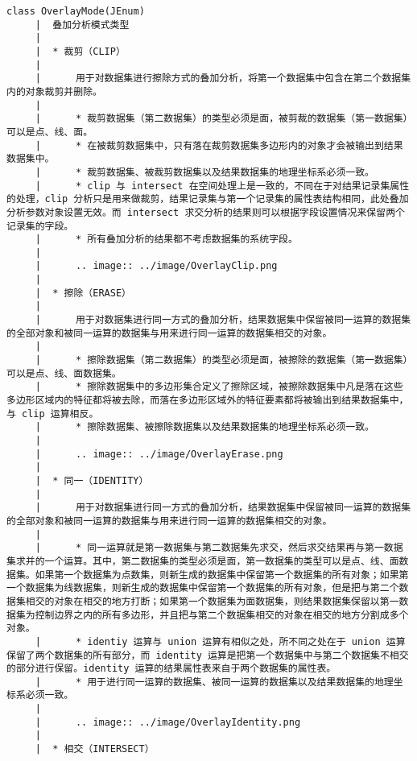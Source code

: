 \documentclass[11pt]{article}
\begin{document}
\begin{Verbatim}[commandchars=\\\{\}]
    class OverlayMode(JEnum)
     |  叠加分析模式类型
     |  
     |  * 裁剪（CLIP）
     |  
     |      用于对数据集进行擦除方式的叠加分析，将第一个数据集中包含在第二个数据集内的对象裁剪并删除。
     |  
     |      * 裁剪数据集（第二数据集）的类型必须是面，被剪裁的数据集（第一数据集）可以是点、线、面。
     |      * 在被裁剪数据集中，只有落在裁剪数据集多边形内的对象才会被输出到结果数据集中。
     |      * 裁剪数据集、被裁剪数据集以及结果数据集的地理坐标系必须一致。
     |      * clip 与 intersect 在空间处理上是一致的，不同在于对结果记录集属性的处理，clip 分析只是用来做裁剪，结果记录集与第一个记录集的属性表结构相同，此处叠加分析参数对象设置无效。而 intersect 求交分析的结果则可以根据字段设置情况来保留两个记录集的字段。
     |      * 所有叠加分析的结果都不考虑数据集的系统字段。
     |  
     |      .. image:: ../image/OverlayClip.png
     |  
     |  * 擦除（ERASE）
     |  
     |      用于对数据集进行同一方式的叠加分析，结果数据集中保留被同一运算的数据集的全部对象和被同一运算的数据集与用来进行同一运算的数据集相交的对象。
     |  
     |      * 擦除数据集（第二数据集）的类型必须是面，被擦除的数据集（第一数据集）可以是点、线、面数据集。
     |      * 擦除数据集中的多边形集合定义了擦除区域，被擦除数据集中凡是落在这些多边形区域内的特征都将被去除，而落在多边形区域外的特征要素都将被输出到结果数据集中，与 clip 运算相反。
     |      * 擦除数据集、被擦除数据集以及结果数据集的地理坐标系必须一致。
     |  
     |      .. image:: ../image/OverlayErase.png
     |  
     |  * 同一（IDENTITY）
     |  
     |      用于对数据集进行同一方式的叠加分析，结果数据集中保留被同一运算的数据集的全部对象和被同一运算的数据集与用来进行同一运算的数据集相交的对象。
     |  
     |      * 同一运算就是第一数据集与第二数据集先求交，然后求交结果再与第一数据集求并的一个运算。其中，第二数据集的类型必须是面，第一数据集的类型可以是点、线、面数据集。如果第一个数据集为点数集，则新生成的数据集中保留第一个数据集的所有对象；如果第一个数据集为线数据集，则新生成的数据集中保留第一个数据集的所有对象，但是把与第二个数据集相交的对象在相交的地方打断；如果第一个数据集为面数据集，则结果数据集保留以第一数据集为控制边界之内的所有多边形，并且把与第二个数据集相交的对象在相交的地方分割成多个对象。
     |      * identiy 运算与 union 运算有相似之处，所不同之处在于 union 运算保留了两个数据集的所有部分，而 identity 运算是把第一个数据集中与第二个数据集不相交的部分进行保留。identity 运算的结果属性表来自于两个数据集的属性表。
     |      * 用于进行同一运算的数据集、被同一运算的数据集以及结果数据集的地理坐标系必须一致。
     |  
     |      .. image:: ../image/OverlayIdentity.png
     |  
     |  * 相交（INTERSECT）

\end{Verbatim}
\end{document}
